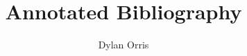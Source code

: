 \documentclass{article}
\begin{document}
\title{Annotated Bibliography}
\author{Dylan Orris}

\maketitle
\nocite{*}




\end{document}
